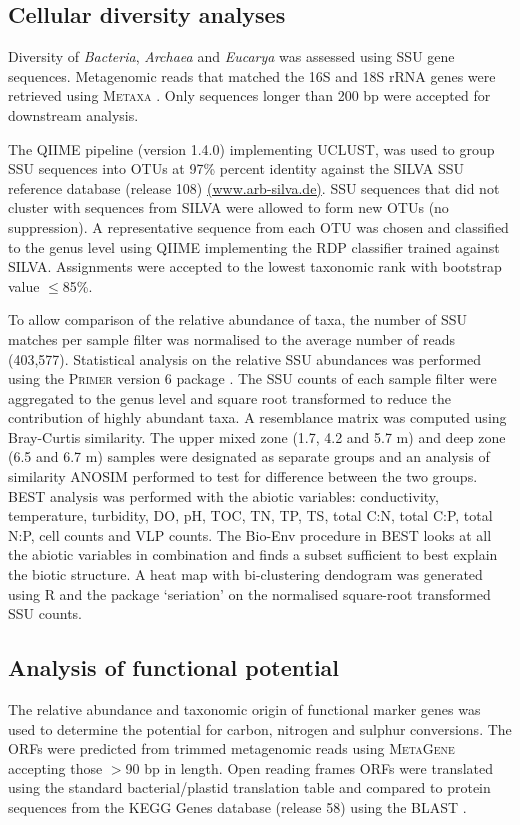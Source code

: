 \subsection{Cellular diversity analyses}
Diversity of \emph{Bacteria}, \emph{Archaea} and \emph{Eucarya} was assessed using \ac{SSU} gene sequences. 
Metagenomic reads that matched the 16S and 18S \ac{rRNA} genes were retrieved using \textsc{Metaxa} \cite{Bengtsson2011}. 
Only sequences longer than 200 bp were accepted for downstream analysis. 

The \ac{QIIME} pipeline (version 1.4.0) \cite{Caporaso2010} implementing \textsc{UCLUST}, was used to group \ac{SSU} sequences into \acp{OTU} at 97\% percent identity against the SILVA \ac{SSU} reference database (release 108)
\url{(www.arb-silva.de)}. 
\ac{SSU} sequences that did not cluster with sequences from \textsc{SILVA} were allowed to form new \acp{OTU} (no suppression). 
A representative sequence from each \ac{OTU} was chosen and classified to the genus level using \ac{QIIME} implementing the \ac{RDP} classifier \cite{Wang2007} trained against \textsc{SILVA}. 
Assignments were accepted to the lowest taxonomic rank with bootstrap value $\leq$85\%. 

To allow comparison of the relative abundance of taxa, the number of \ac{SSU} matches per sample filter was normalised to the average number of reads (403,577). 
Statistical analysis on the relative \ac{SSU} abundances was performed using the \textsc{Primer} version 6 package \cite{Clarke2006}. 
The \ac{SSU} counts of each sample filter were aggregated to the genus level and square root transformed to reduce the contribution of highly abundant taxa. 
A resemblance matrix was computed using Bray-Curtis similarity. 
The upper mixed zone (1.7, 4.2 and 5.7 m) and deep zone (6.5 and 6.7 m) samples were designated as separate groups and an analysis of similarity \ac{ANOSIM} performed to test for difference between the two groups. 
BEST analysis was performed with the abiotic variables: conductivity, temperature, turbidity, \ac{DO}, pH, \ac{TOC}, \ac{TN}, \ac{TP}, \ac{TS}, total C:N, total C:P, total N:P, cell counts and \ac{VLP} counts. 
The Bio-Env procedure in \textsc{BEST} looks at all the abiotic variables in combination and finds a subset sufficient to best explain the biotic structure. 
A heat map with bi-clustering dendogram was generated using R and the package `seriation' \cite{Hahsler2008} on the normalised square-root transformed \ac{SSU} counts.

\subsection{Analysis of functional potential}
The relative abundance and taxonomic origin of functional marker genes was used to determine the potential for carbon, nitrogen and sulphur conversions.
The \acp{ORF} were predicted from trimmed metagenomic reads using \textsc{MetaGene} \cite{Noguchi2006} accepting those $>$90 bp in length. 
Open reading frames \acsp{ORF} were translated using the standard bacterial/plastid translation table and compared to protein sequences from the \ac{KEGG} Genes database (release 58) using the \ac{BLAST} \cite{Altschul1990}. 

